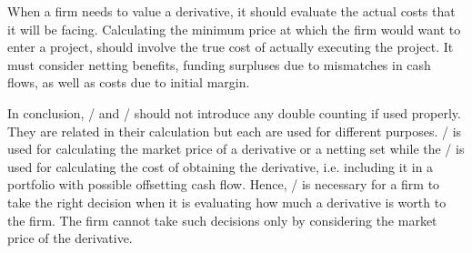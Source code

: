 \documentclass[main.tex]{subfiles}
\begin{document}
    When a firm needs to value a derivative, 
    it should evaluate the actual costs that it will be facing.
    Calculating the minimum price at which the firm would want to enter a project,
    should involve the true cost of actually executing the project.
    It must consider netting benefits, funding surpluses due to mismatches in cash flows,
    as well as costs due to initial margin.

    In conclusion, \FVA/ and \DVA/ should not introduce any double counting if used properly.
    They are related in their calculation but each are used for different purposes.
    \DVA/ is used for calculating the market price of a derivative or a netting set
    while the \FVA/ is used for calculating the cost of obtaining the derivative,
    i.e. including it in a portfolio with possible offsetting cash flow.
    Hence, \FVA/ is necessary for a firm to take the right decision when it is evaluating
    how much a derivative is worth to the firm.
    The firm cannot take such decisions only by considering the market price of the derivative.
    
\end{document}
